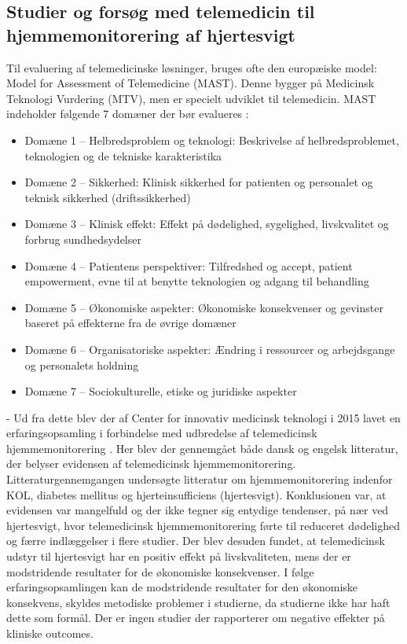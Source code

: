 \subsection{Studier og forsøg med telemedicin til hjemmemonitorering af hjertesvigt} 
Til evaluering af telemedicinske løsninger, bruges ofte den europæiske model: Model for Assessment of Telemedicine (MAST). Denne bygger på Medicinsk Teknologi Vurdering (MTV), men er specielt udviklet til telemedicin. MAST indeholder følgende 7 domæner der bør evalueres \citep{erfaringsopsamlingTelemedicin}:
\begin{itemize}
    \item Domæne 1 – Helbredsproblem og teknologi: Beskrivelse af helbredsproblemet, teknologien og de tekniske karakteristika
    \item Domæne 2 – Sikkerhed: Klinisk sikkerhed for patienten og personalet og teknisk sikkerhed (driftssikkerhed)
    \item Domæne 3 – Klinisk effekt: Effekt på dødelighed, sygelighed, livskvalitet og forbrug sundhedsydelser
    \item Domæne 4 – Patientens perspektiver: Tilfredshed og accept, patient empowerment, evne til at benytte teknologien og adgang til behandling
    \item Domæne 5 – Økonomiske aspekter: Økonomiske konsekvenser og gevinster baseret på effekterne fra de øvrige domæner
    \item Domæne 6 – Organisatoriske aspekter: Ændring i ressourcer og arbejdsgange og personalets holdning
    \item Domæne 7 – Sociokulturelle, etiske og juridiske aspekter
\end{itemize}
-
Ud fra dette blev der af Center for innovativ medicinsk teknologi i 2015 lavet en erfaringsopsamling i forbindelse med udbredelse af telemedicinsk hjemmemonitorering \citep{erfaringsopsamlingTelemedicin}. Her blev der gennemgået både dansk og engelsk litteratur, der belyser evidensen af telemedicinsk hjemmemonitorering. Litteraturgennemgangen undersøgte litteratur om hjemmemonitorering indenfor KOL, diabetes mellitus og hjerteinsufficiens (hjertesvigt). Konklusionen var, at evidensen var mangelfuld og der ikke tegner sig entydige tendenser, på nær ved hjertesvigt, hvor telemedicinsk hjemmemonitorering førte til reduceret dødelighed og færre indlæggelser i flere studier. Der blev desuden fundet, at telemedicinsk udstyr til hjertesvigt har en positiv effekt på livskvaliteten, mens der er modstridende resultater for de økonomiske konsekvenser. I følge erfaringsopsamlingen kan de modstridende resultater for den økonomiske konsekvens, skyldes metodiske problemer i studierne, da studierne ikke har haft dette som formål. Der er ingen studier der rapporterer om negative effekter på kliniske outcomes. \citep{erfaringsopsamlingTelemedicin}\\
